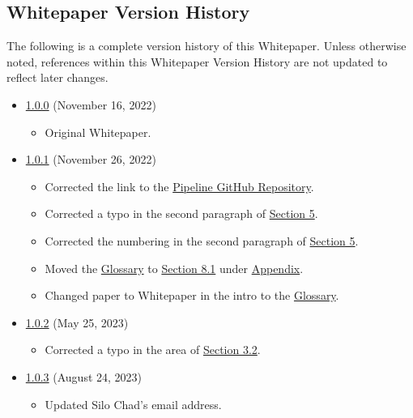 \documentclass[class=article, crop=false]{standalone}
\begin{document}
\subsection{Whitepaper Version History}
The following is a complete version history of this Whitepaper. Unless otherwise noted, references within this Whitepaper Version History are not updated to reflect later changes.

\begin{itemize}[topsep=0pt, itemsep=3pt,leftmargin=16pt]
    \item \href{https://github.com/BeanstalkFarms/Pipeline-Whitepaper/blob/master/version-history/pipeline1_0_0.pdf}{1.0.0} (November 16, 2022)
    \begin{itemize}
        \item Original Whitepaper.
    \end{itemize}
    \item \href{https://github.com/BeanstalkFarms/Pipeline-Whitepaper/blob/master/version-history/pipeline1_0_1.pdf}{1.0.1} (November 26, 2022)
    \begin{itemize}
        \item Corrected the link to the \href{https://github.com/BeanstalkFarms/Pipeline}{Pipeline GitHub Repository}.
        \item Corrected a typo in the second paragraph of \hyperlink{section.5}{Section 5}.
        \item Corrected the numbering in the second paragraph of \hyperlink{section.5}{Section 5}.
        \item Moved the \hyperlink{subsection.8.1}{Glossary} to \hyperlink{subsection.8.1}{Section 8.1} under \hyperlink{section.8}{Appendix}.
        \item Changed paper to Whitepaper in the intro to the \hyperlink{subsection.8.1}{Glossary}.
    \end{itemize}
    \item \href{https://github.com/BeanstalkFarms/Pipeline-Whitepaper/blob/master/version-history/pipeline1_0_2.pdf}{1.0.2} (May 25, 2023)
    \begin{itemize}
        \item Corrected a typo in the  area of \hyperlink{subsection.3.2}{Section 3.2}.
    \end{itemize}
    \item \href{https://github.com/BeanstalkFarms/Pipeline-Whitepaper/blob/master/version-history/pipeline1_0_3.pdf}{1.0.3} (August 24, 2023)
    \begin{itemize}
        \item Updated Silo Chad's email address. 
    \end{itemize}
    
\end{itemize}
\end{document}

